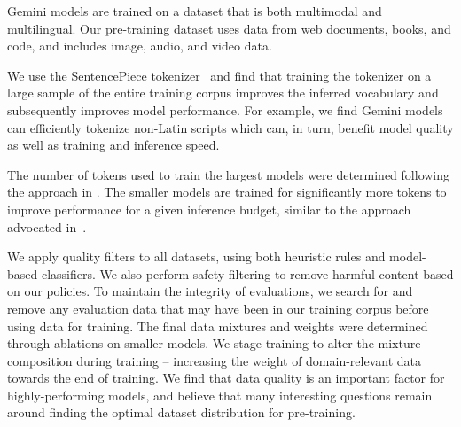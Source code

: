 Gemini models are trained on a dataset that is both multimodal and multilingual. Our pre-training dataset uses data from web documents, books, and code, and includes image, audio, and video data.

We use the SentencePiece tokenizer~\cite{sentencepiece} and find that training the tokenizer on a large sample of the entire training corpus improves the inferred vocabulary and subsequently improves model performance. For example, we find Gemini models can efficiently tokenize non-Latin scripts which can, in turn, benefit model quality as well as training and inference speed.

The number of tokens used to train the largest models were determined following the approach in \citet{chinchilla}. The smaller models are trained for significantly more tokens to improve performance for a given inference budget, similar to the approach advocated in~\citet{llama}. 

We apply quality filters to all datasets, using both heuristic rules and model-based classifiers. We also perform safety filtering to remove harmful content based on our policies. To maintain the integrity of evaluations, we search for and remove any evaluation data that may have been in our training corpus before using data for training. The final data mixtures and weights were determined through ablations on smaller models. We stage training to alter the mixture composition during training – increasing the weight of domain-relevant data towards the end of training. We find that data quality is an important factor for highly-performing models, and believe that many interesting questions remain around finding the optimal dataset distribution for pre-training.